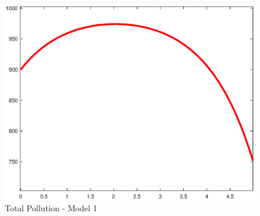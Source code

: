 \documentclass{article}
\newlength\imagewidth
\begin{document}
\begin{figure}[!ht]
    \centering
    \includegraphics[width=1.5\imagewidth]{Model1-optt.eps}
    \caption{Total Pollution - Model 1}
    \label{fig:model1_optt}
\end{figure}

\newpage







\end{document}
